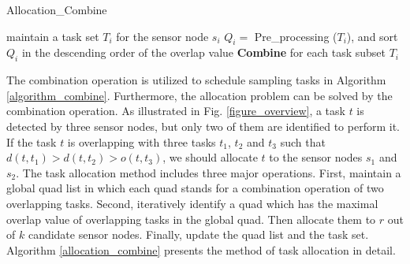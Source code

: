 \documentclass[prodmode,acmtosn]{acmsmall}
\begin{document}
\begin{algorithm}[t]
	\SetAlgoNoLine
    \caption{Allocation\_Combine}
    \label{allocation_combine}
        maintain a task set $T_i$ for the sensor node $s_i$\;
        $Q_i=$ Pre\_processing ($T_i$), and sort $Q_i$ in the descending order of the overlap value\;
        \textbf{Combine} for each task subset $T_i$\;
\end{algorithm}


The combination operation is utilized to schedule sampling tasks in Algorithm \ref{algorithm_combine}. Furthermore, the allocation problem can be solved by the combination operation. As illustrated in Fig. \ref{figure_overview}, a task $t$ is detected by three sensor nodes, but only two of them are identified to perform it. If the task $t$ is overlapping with three tasks $t_1$, $t_2$ and $t_3$ such that $d(t,t_1)\mathrm{>}d(t,t_2)\mathrm{>}o(t,t_3)$,  we should allocate $t$ to the sensor nodes $s_1$ and $s_2$.  The task allocation method includes three major operations. First, maintain a global quad list in which each quad stands for a combination operation of two overlapping tasks. Second, iteratively identify a quad which has the maximal overlap value of overlapping tasks in the global quad. Then allocate them to $r$  out of $k$ candidate sensor  nodes. Finally, update the quad list and the task set. Algorithm \ref{allocation_combine} presents the method of task allocation in detail.
\end{document}
